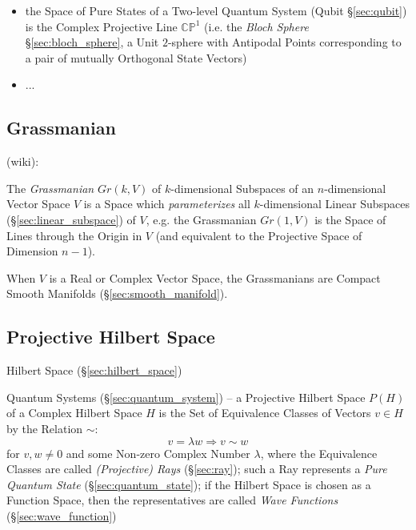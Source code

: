 \begin{itemize}
  \item the Space of Pure States of a Two-level Quantum System (Qubit
    \S\ref{sec:qubit}) is the Complex Projective Line $\mathbb{CP}^1$ (i.e. the
    \emph{Bloch Sphere} \S\ref{sec:bloch_sphere}, a Unit $2$-sphere with
    Antipodal Points corresponding to a pair of mutually Orthogonal State
    Vectors)
  \item ...
\end{itemize}



\subsection{Grassmanian}\label{sec:grassmanian}

(wiki):

The \emph{Grassmanian} $Gr(k,V)$ of $k$-dimensional Subspaces of an
$n$-dimensional Vector Space $V$ is a Space which \emph{parameterizes} all
$k$-dimensional Linear Subspaces (\S\ref{sec:linear_subspace}) of $V$, e.g.
the Grassmanian $Gr(1,V)$ is the Space of Lines through the Origin in $V$ (and
equivalent to the Projective Space of Dimension $n-1$).

When $V$ is a Real or Complex Vector Space, the Grassmanians are Compact Smooth
Manifolds (\S\ref{sec:smooth_manifold}).



\subsection{Projective Hilbert Space}\label{sec:projective_hilbert_space}

Hilbert Space (\S\ref{sec:hilbert_space})

\fist Quantum Systems (\S\ref{sec:quantum_system}) -- a
Projective Hilbert Space $P(H)$ of a Complex Hilbert Space $H$ is the Set of
Equivalence Classes of Vectors $v \in H$ by the Relation $\sim$:
\[
  v = \lambda w \Rightarrow v \sim w
\]
for $v,w \neq 0$ and some Non-zero Complex Number $\lambda$, where the
Equivalence Classes are called \emph{(Projective) Rays} (\S\ref{sec:ray}); such
a Ray represents a \emph{Pure Quantum State} (\S\ref{sec:quantum_state}); if the
Hilbert Space is chosen as a Function Space, then the representatives are called
\emph{Wave Functions} (\S\ref{sec:wave_function})



